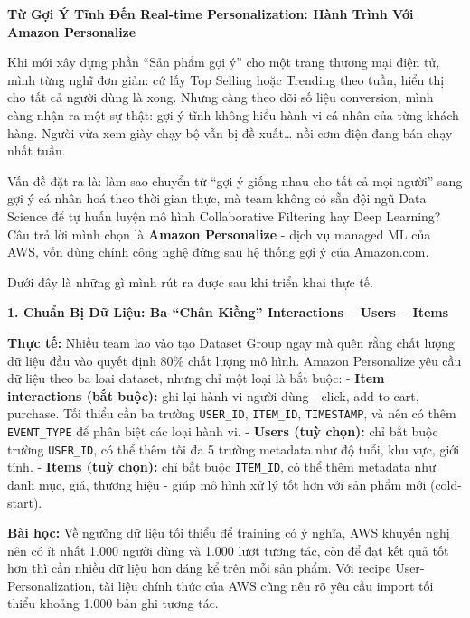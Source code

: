 \vspace{0.5em}\noindent\textbf{Từ Gợi Ý Tĩnh Đến Real-time Personalization: Hành Trình Với
Amazon
Personalize}\par

Khi mới xây dựng phần ``Sản phẩm gợi ý'' cho một trang thương mại điện
tử, mình từng nghĩ đơn giản: cứ lấy Top Selling hoặc Trending theo tuần,
hiển thị cho tất cả người dùng là xong. Nhưng càng theo dõi số liệu
conversion, mình càng nhận ra một sự thật: gợi ý tĩnh không hiểu hành vi
cá nhân của từng khách hàng. Người vừa xem giày chạy bộ vẫn bị đề
xuất\ldots{} nồi cơm điện đang bán chạy nhất tuần.

Vấn đề đặt ra là: làm sao chuyển từ ``gợi ý giống nhau cho tất cả mọi
người'' sang gợi ý cá nhân hoá theo thời gian thực, mà team không có sẵn
đội ngũ Data Science để tự huấn luyện mô hình Collaborative Filtering
hay Deep Learning? Câu trả lời mình chọn là \textbf{Amazon Personalize}
- dịch vụ managed ML của AWS, vốn dùng chính công nghệ đứng sau hệ thống
gợi ý của Amazon.com.

Dưới đây là những gì mình rút ra được sau khi triển khai thực tế.

\vspace{0.5em}\noindent\textbf{1. Chuẩn Bị Dữ Liệu: Ba ``Chân Kiềng'' Interactions -- Users
--
Items}\par

\textbf{Thực tế:} Nhiều team lao vào tạo Dataset Group ngay mà quên rằng
chất lượng dữ liệu đầu vào quyết định 80\% chất lượng mô hình. Amazon
Personalize yêu cầu dữ liệu theo ba loại dataset, nhưng chỉ một loại là
bắt buộc: - \textbf{Item interactions (bắt buộc):} ghi lại hành vi người
dùng - click, add-to-cart, purchase. Tối thiểu cần ba trường
\texttt{USER\_ID}, \texttt{ITEM\_ID}, \texttt{TIMESTAMP}, và nên có thêm
\texttt{EVENT\_TYPE} để phân biệt các loại hành vi. - \textbf{Users (tuỳ
chọn):} chỉ bắt buộc trường \texttt{USER\_ID}, có thể thêm tối đa 5
trường metadata như độ tuổi, khu vực, giới tính. - \textbf{Items (tuỳ
chọn):} chỉ bắt buộc \texttt{ITEM\_ID}, có thể thêm metadata như danh
mục, giá, thương hiệu - giúp mô hình xử lý tốt hơn với sản phẩm mới
(cold-start).

\textbf{Bài học:} Về ngưỡng dữ liệu tối thiểu để training có ý nghĩa,
AWS khuyến nghị nên có ít nhất 1.000 người dùng và 1.000 lượt tương tác,
còn để đạt kết quả tốt hơn thì cần nhiều dữ liệu hơn đáng kể trên mỗi
sản phẩm. Với recipe User-Personalization, tài liệu chính thức của AWS
cũng nêu rõ yêu cầu import tối thiểu khoảng 1.000 bản ghi tương tác.

